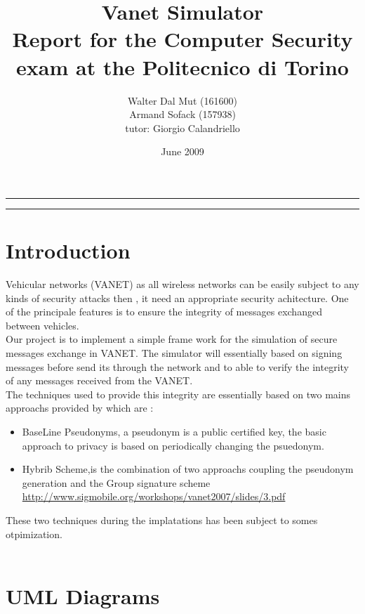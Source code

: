 \documentclass[a4paper,12pt]{article}
\begin{document}
\title{Vanet Simulator
\\
{\normalsize Report for the Computer Security exam at the Politecnico di Torino}
}
\author{Walter Dal Mut (161600)\\Armand Sofack (157938)
\\
{\normalsize tutor: Giorgio Calandriello}
}
\date{June 2009}
\maketitle

\vfill

\rule{\textwidth}{1pt}

\tableofcontents

\rule{\textwidth}{1pt}

\vfill

\newpage
\section{Introduction}
Vehicular networks  (VANET) as all wireless networks can be easily subject to any kinds of security  attacks  then , it need an appropriate security achitecture. One of the principale features is to ensure the integrity of messages exchanged between vehicles.\\
Our project is to implement a simple frame work for the simulation of secure messages exchange in VANET. The simulator will essentially based on  signing  messages  before send its through the network and to able to verify  the integrity of any messages received from the VANET.\\
The techniques used to provide this integrity are essentially based on two mains approachs provided by\cite{calandriello} which are :
\begin{itemize}
\item BaseLine Pseudonyms, a pseudonym is a public certified key,
the basic approach to privacy is based on periodically changing the psuedonym.
\item Hybrib Scheme,is the combination of two approachs coupling the pseudonym generation and the Group signature scheme
\\
\url{http://www.sigmobile.org/workshops/vanet2007/slides/3.pdf}
\end{itemize}
These two techniques during the implatations has been subject to somes otpimization.
\\
\\

\section{UML Diagrams}

\end{document}
